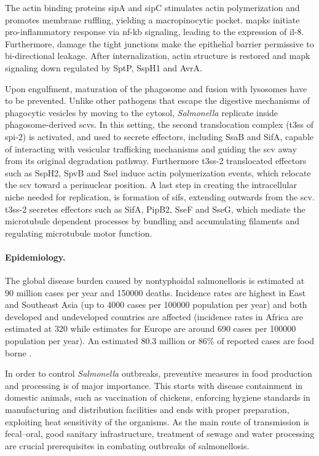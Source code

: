 The actin binding proteins \gls{sip}A and \gls{sip}C stimulates actin polymerization and promotes membrane ruffling, yielding a macropinocytic pocket. \Glspl{mapk} initiate pro-inflammatory response via \gls{nf-kb} signaling, leading to the expression of \gls{il-8}. Furthermore, damage the tight junctions make the epithelial barrier permissive to bi-directional leakage. After internalization, actin structure is restored and \gls{mapk} signaling down regulated by SptP, SspH1 and AvrA.

Upon engulfment, maturation of the phagosome and fusion with lysosomes have to be prevented. Unlike other pathogens that escape the digestive mechanisms of phagocytic vesicles by moving to the cytosol, \textit{Salmonella} replicate inside phagosome-derived \glspl{scv}. In this setting, the second translocation complex (\gls{t3ss} of \acrshort{spi}-2) is activated, and used to secrete effectors, including SsaB and SifA, capable of interacting with vesicular trafficking mechanisms and guiding the \gls{scv} away from its original degradation pathway. Furthermore \gls{t3ss}-2 translocated effectors such as SspH2, SpvB and Ssel induce actin polymerization events, which relocate the \gls{scv} toward a perinuclear position. A last step in creating the intracellular niche needed for replication, is formation of \glspl{sif}, extending outwards from the \gls{scv}. \Gls{t3ss}-2 secretes effectors such as SifA, PipB2, SseF and SseG, which mediate the microtubule dependent processes by bundling and accumulating filaments and regulating microtubule motor function.

\paragraph{Epidemiology.}
The global disease burden caused by nontyphoidal salmonellosis is estimated at 90 million cases per year and 150000 deaths. Incidence rates are highest in East and Southeast Asia (up to 4000 cases per 100000 population per year) and both developed and undeveloped countries are affected (incidence rates in Africa are estimated at 320 while estimates for Europe are around 690 cases per 100000 population per year). An estimated 80.3 million or 86\% of reported cases are food borne \citep{Majowicz2010}.

In order to control \textit{Salmonella} outbreaks, preventive measures in food production and processing is of major importance. This starts with disease containment in domestic animals, such as vaccination of chickens, enforcing  hygiene standards in manufacturing and distribution facilities and ends with proper preparation, exploiting heat sensitivity of the organisms. As the main route of transmission is fecal--oral, good sanitary infrastructure, treatment of sewage and water processing are crucial prerequisites in combating outbreaks of salmonellosis.

